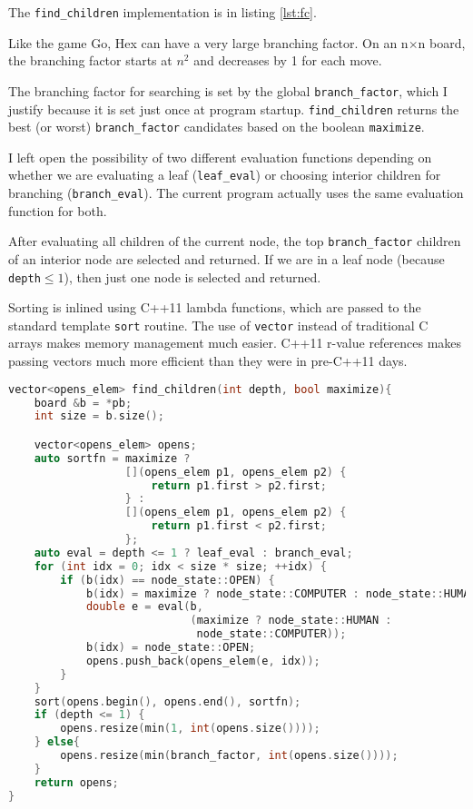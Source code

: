 \documentclass[12pt,titlepage]{amsart}
\begin{document}
The \texttt{find\_children} implementation is in listing \ref{lst:fc}.

Like the game Go, Hex can have a very large branching factor. On an n$\times$n board,
the branching factor starts at $n^2$ and decreases by 1 for each move.

The branching factor for searching is set by the global \texttt{branch\_factor},
which I justify because it is set just once at program startup.
\texttt{find\_children} returns the best (or worst) \texttt{branch\_factor}
candidates based on the boolean \texttt{maximize}.

I left open the possibility of two different evaluation functions depending on
whether we are evaluating a leaf (\texttt{leaf\_eval}) or choosing interior
children for branching (\texttt{branch\_eval}). The current program actually
uses the same evaluation function for both.

After evaluating all children of the current node, the top
\texttt{branch\_factor} children of an interior node are selected and returned.
If we are in a leaf node (because \texttt{depth}$\leq 1$), then just one node is
selected and returned.

Sorting is inlined using C++11 lambda functions, which are passed to the
standard template \texttt{sort} routine. The use of \texttt{vector} instead of
traditional C arrays makes memory management much easier. C++11 r-value
references makes passing vectors much more efficient than they were in pre-C++11
days.

\singlespacing
\begin{lstlisting}[language=C++,float,label={lst:fc},
                   basicstyle=\small,caption=find\_children]
vector<opens_elem> find_children(int depth, bool maximize){
    board &b = *pb;
    int size = b.size();

    vector<opens_elem> opens;
    auto sortfn = maximize ?
                  [](opens_elem p1, opens_elem p2) {
                      return p1.first > p2.first;
                  } :
                  [](opens_elem p1, opens_elem p2) {
                      return p1.first < p2.first;
                  };
    auto eval = depth <= 1 ? leaf_eval : branch_eval;
    for (int idx = 0; idx < size * size; ++idx) {
        if (b(idx) == node_state::OPEN) {
            b(idx) = maximize ? node_state::COMPUTER : node_state::HUMAN;
            double e = eval(b,
                            (maximize ? node_state::HUMAN :
                             node_state::COMPUTER));
            b(idx) = node_state::OPEN;
            opens.push_back(opens_elem(e, idx));
        }
    }
    sort(opens.begin(), opens.end(), sortfn);
    if (depth <= 1) {
        opens.resize(min(1, int(opens.size())));
    } else{
        opens.resize(min(branch_factor, int(opens.size())));
    }
    return opens;
}
\end{lstlisting}
\doublespacing
\end{document}
